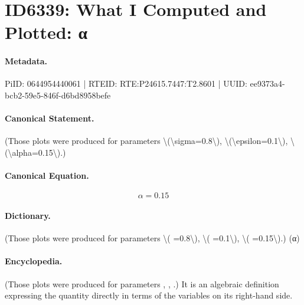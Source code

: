 \section*{ID6339: What I Computed and Plotted: α}
\paragraph{Metadata.}
PiID: 0644954440061 | RTEID: RTE:P24615.7447:T2.8601 | UUID: ee9373a4-bcb2-59e5-846f-d6bd8958befe

\paragraph{Canonical Statement.}
(Those plots were produced for parameters \textbackslash{}(\textbackslash{}sigma=0.8\textbackslash{}), \textbackslash{}(\textbackslash{}epsilon=0.1\textbackslash{}), \textbackslash{}(\textbackslash{}alpha=0.15\textbackslash{}).)

\paragraph{Canonical Equation.}
\[
\alpha=0.15
\]

\paragraph{Dictionary.}
(Those plots were produced for parameters \textbackslash{}( =0.8\textbackslash{}), \textbackslash{}( =0.1\textbackslash{}), \textbackslash{}( =0.15\textbackslash{}).) (α)

\paragraph{Encyclopedia.}
(Those plots were produced for parameters , , .) It is an algebraic definition expressing the quantity directly in terms of the variables on its right-hand side.
